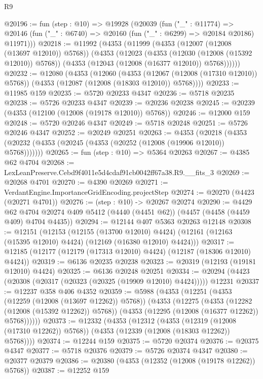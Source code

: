 \begin{lexlean}{R9}
\begin{coremodule}
@20196 := fun (step : @10) =>
  @19928
    (@20039
      (fun ("_" : @11774) =>
      @20146 (fun ("_" : @6740) => @20160 (fun ("_" : @6299) => @20184 @20186) @11971)))
@20218 := @11992
    (@4353
      (@11999
        (@4353 (@12007 (@12008 (@13697 @12010)) @5768))
        (@4353
          (@12023
            (@4353 (@12030 (@12008 (@15392 @12010)) @5768))
            (@4353 (@12043 (@12008 (@16377 @12010)) @5768))))))
@20232 := @12080
    (@4353
      (@12060
        (@4353 (@12067 (@12008 (@17310 @12010)) @5768))
        (@4353 (@12087 (@12008 (@18303 @12010)) @5768))))
@20233 := @11985 @159
@20235 := @5720 @20233 @4347
@20236 := @5718 @20235
@20238 := @5726 @20233 @4347
@20239 := @20236 @20238
@20245 := @20239 (@4353 (@12100 (@12008 (@19178 @12010)) @5768))
@20246 := @12000 @159
@20248 := @5720 @20246 @4347
@20249 := @5718 @20248
@20251 := @5726 @20246 @4347
@20252 := @20249 @20251
@20263 := @4353
    (@20218 (@4353 (@20232 (@4353 (@20245 (@4353 (@20252 (@12008 (@19906 @12010)) @5768)))))))
@20265 := fun (step : @10) => @5364 @20263
@20267 := @4385 @62 @4704
@20268 := LexLeanPreserve.Cebd9f4011e5d4cdaf91cb0042ff67a38.R9.__fits_3
@20269 := @20268 @4701
@20270 := @4390 @20269
@20271 := VerdantEngine.ImportanceGridEncoding.projectStep
@20274 := @20270 (@4423 (@20271 @4701))
@20276 := (step : @10) -> @20267 @20274
@20290 := @4429
    @62
    @4704
    @20274
    @409
    @5412
    (@4440 (@4451 @62))
    (@4457 (@4458 (@4459 @409) @4704 @4435))
@20294 := @12144 @407 @5363 @20263 @12148
@20308 := @12151
    (@12153
      (@12155 (@13700 @12010) @4424)
      (@12161 (@12163 (@15395 @12010) @4424) (@12169 (@16380 @12010) @4424)))
@20317 := @12185 (@12177 (@12179 (@17313 @12010) @4424) (@12187 (@18306 @12010) @4424))
@20319 := @6136 @20235 @20238
@20323 := @20319 (@12193 (@19181 @12010) @4424)
@20325 := @6136 @20248 @20251
@20334 := @20294 (@4423 (@20308 (@20317 (@20323 (@20325 (@19909 @12010) @4424))))) @12231
@20337 := @12237 @358 @406 @4352
@20359 := @5988
    (@4353
      (@12251
        (@4353 (@12259 (@12008 (@13697 @12262)) @5768))
        (@4353
          (@12275
            (@4353 (@12282 (@12008 (@15392 @12262)) @5768))
            (@4353 (@12295 (@12008 (@16377 @12262)) @5768))))))
@20373 := @12332
    (@4353
      (@12312
        (@4353 (@12319 (@12008 (@17310 @12262)) @5768))
        (@4353 (@12339 (@12008 (@18303 @12262)) @5768))))
@20374 := @12244 @159
@20375 := @5720 @20374
@20376 := @20375 @4347
@20377 := @5718 @20376
@20379 := @5726 @20374 @4347
@20380 := @20377 @20379
@20386 := @20380 (@4353 (@12352 (@12008 (@19178 @12262)) @5768))
@20387 := @12252 @159

\end{coremodule}
\end{lexlean}
